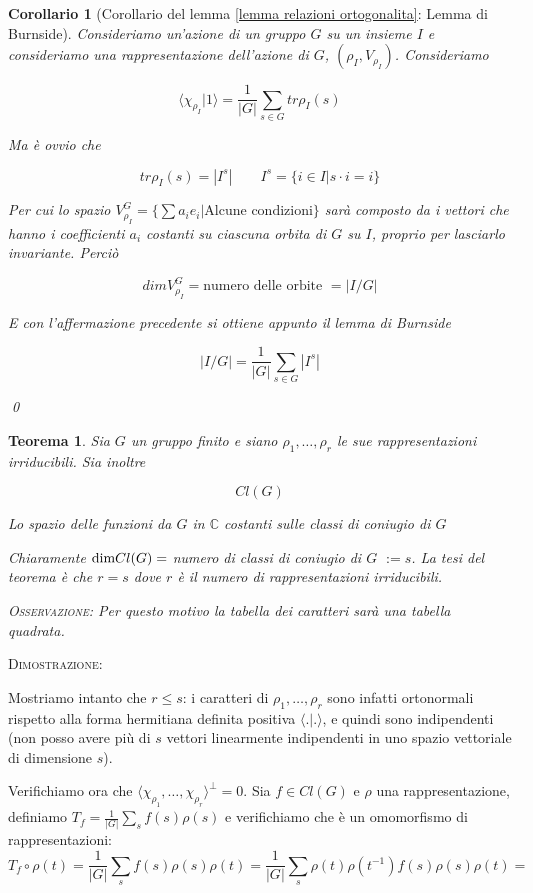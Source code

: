 \documentclass[11pt]{article}
\theoremstyle{plain}
\newtheorem{thm}{Teorema}[section]
\newtheorem*{cor}{Corollario}
\theoremstyle{definition}
\theoremstyle{remark}
\newcommand{\C}{\mathbb{C}}
\newcommand{\dsum}{\displaystyle\sum}
\newcommand{\ddim}{\textnormal{dim}}
\begin{document}
\begin{cor}[Corollario del lemma \ref{lemma relazioni ortogonalita}: Lemma di Burnside]

Consideriamo un'azione di un gruppo $G$ su un insieme $I$ e consideriamo una rappresentazione dell'azione di $G$, $(\rho_I, V_{\rho_I})$. Consideriamo

\[\langle \chi_{\rho_I} | 1 \rangle = \dfrac{1}{|G|} \dsum_{s\in G} tr \rho_I(s)\]

Ma è ovvio che 

\[tr \rho_I(s) = |I^s| \qquad I^s = \{ i \in I | s \cdot i = i\} \]

Per cui lo spazio $V_{\rho_I}^G = \{\dsum a_i e_i | \text{Alcune condizioni}\}$ sarà composto da i vettori che hanno i coefficienti $a_i$ costanti su ciascuna orbita di $G$ su $I$, proprio per lasciarlo invariante. Perciò 

\[ dimV_{\rho_I}^G = \text{numero delle orbite } = |I/G|\]

E con l'affermazione precedente si ottiene appunto il lemma di Burnside

\[ |I/G| = \dfrac{1}{|G|} \dsum_{s\in G} |I^s|\]

\qed
\end{cor}



\begin{thm} Sia $G$ un gruppo finito e siano $\rho_1, \ldots , \rho_r$ le sue rappresentazioni irriducibili. Sia inoltre 

\[Cl(G)  \]

Lo spazio delle funzioni da $G$ in $\C$ costanti sulle classi di coniugio di $G$

Chiaramente $\ddim Cl(G) = $ numero di classi di coniugio di $G$ $:= s$. La tesi del teorema è che $r = s$ 
dove $r$ è il numero di rappresentazioni irriducibili. 

\textsc{Osservazione:} Per questo motivo la tabella dei caratteri sarà una tabella quadrata.

\end{thm}

\textsc{Dimostrazione:}
 
Mostriamo intanto che $r \leq s$: i caratteri di $\rho_1, \ldots , \rho_r$ sono infatti ortonormali rispetto alla forma hermitiana
definita positiva $\langle . | .\rangle$, e quindi sono indipendenti (non posso avere più di $s$ vettori linearmente indipendenti 
in uno spazio vettoriale di dimensione $s$).

Verifichiamo ora che $\langle \chi_{\rho_1}, \ldots, \chi_{\rho_r} \rangle ^{\perp} = {0}$. Sia $f \in Cl(G)$ e $\rho$ una rappresentazione,
definiamo $T_f= \frac{1}{|G|}\dsum_s f(s)\rho(s)$ e verifichiamo che è un omomorfismo di rappresentazioni: 
$$ T_f \circ \rho(t) = \frac{1}{|G|}\dsum_s f(s)\rho(s) \rho(t) = \frac{1}{|G|}\dsum_s \rho(t) \rho(t^{-1}) f(s)\rho(s) \rho(t) =$$
\end{document}
